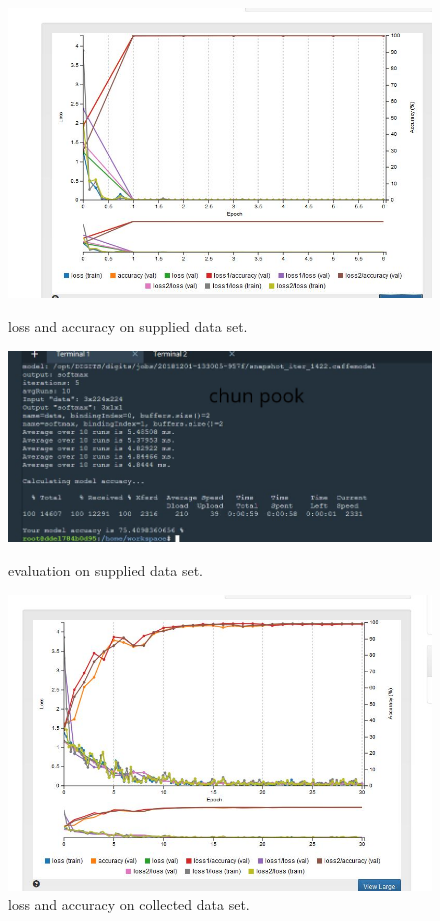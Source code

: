 \documentclass[10pt,journal,compsoc]{IEEEtran}
\begin{document}
\begin{figure}[thpb]
      \centering
      \includegraphics[width=\linewidth]{conveyor}
      \caption{loss and accuracy on supplied data set.}
      \label{fig:loss and accuracy on supplied data set}
      \centering
      \includegraphics[width=\linewidth]{conveyorevaluate}
      \caption{evaluation on supplied data set.}
      \label{fig:evaluation on supplied data set}
      \centering
      \includegraphics[width=\linewidth]{recycle}
      \caption{loss and accuracy on collected data set.}
      \label{fig:loss and accuracy on collected data set}
\end{figure}
\end{document}
